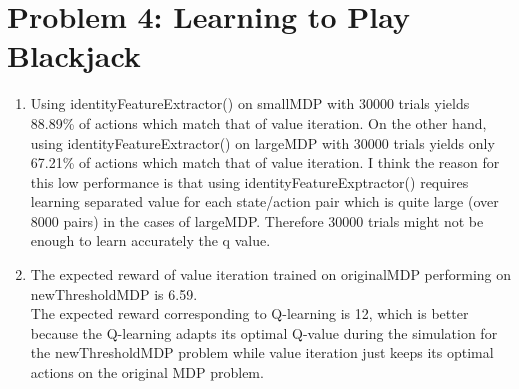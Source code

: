\documentclass[12pt]{article}
\begin{document}
\section*{Problem 4: Learning to Play Blackjack}
\begin{enumerate}[label=(\alph*)]
    \addtocounter{enumi}{1}
    \item
    Using identityFeatureExtractor() on smallMDP with 30000 trials yields 88.89\% of actions which match that of value iteration. On the other hand, using identityFeatureExtractor() on largeMDP with 30000 trials yields only 67.21\% of actions which match that of value iteration. I think the reason for this low performance is that using identityFeatureExptractor() requires learning separated value for each state/action pair which is quite large (over 8000 pairs) in the cases of largeMDP. Therefore 30000 trials might not be enough to learn accurately the q value.
    \addtocounter{enumi}{1}
    \item
    The expected reward of value iteration trained on originalMDP performing on newThresholdMDP is 6.59. \\
    The expected reward corresponding to Q-learning is 12, which is better because the Q-learning adapts its optimal Q-value during the simulation for the newThresholdMDP problem while value iteration just keeps its optimal actions on the original MDP problem.
\end{enumerate}
\end{document}
